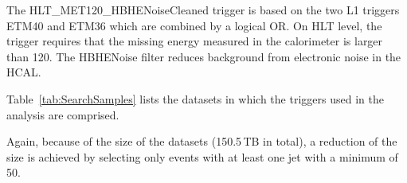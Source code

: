 The HLT\_MET120\_HBHENoiseCleaned trigger is based on the two L1 triggers ETM40 and ETM36 which are combined by a logical OR.
On HLT level, the trigger requires that the missing energy measured in the calorimeter is larger than 120\gev.
The HBHENoise filter reduces background from electronic noise in the HCAL.

Table~\ref{tab:SearchSamples} lists the datasets in which the triggers used in the analysis are comprised. 
\renewcommand{\arraystretch}{1.5}
\begin{table}[!hbt]
\centering
\caption{MET data samples used in the search with the contained intgrated luminosity.}
\label{tab:SearchSamples}
\end{table}  
Again, because of the size of the datasets (150.5\,TB in total), a reduction of the size is achieved by selecting only events with at least one jet with a minimum \pt of 50\gev.\\

